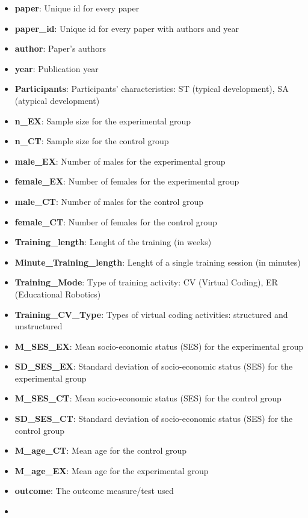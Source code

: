 \documentclass[
]{article}
\providecommand{\tightlist}{%
  \setlength{\itemsep}{0pt}\setlength{\parskip}{0pt}}
\begin{document}
\begin{itemize}
\tightlist
\item
  \textbf{paper}: Unique id for every paper
\item
  \textbf{paper\_id}: Unique id for every paper with authors and year
\item
  \textbf{author}: Paper's authors
\item
  \textbf{year}: Publication year
\item
  \textbf{Participants}: Participants' characteristics: ST (typical development), SA (atypical development)
\item
  \textbf{n\_EX}: Sample size for the experimental group
\item
  \textbf{n\_CT}: Sample size for the control group
\item
  \textbf{male\_EX}: Number of males for the experimental group
\item
  \textbf{female\_EX}: Number of females for the experimental group
\item
  \textbf{male\_CT}: Number of males for the control group
\item
  \textbf{female\_CT}: Number of females for the control group
\item
  \textbf{Training\_length}: Lenght of the training (in weeks)
\item
  \textbf{Minute\_Training\_length}: Lenght of a single training session (in minutes)
\item
  \textbf{Training\_Mode}: Type of training activity: CV (Virtual Coding), ER (Educational Robotics)
\item
  \textbf{Training\_CV\_Type}: Types of virtual coding activities: structured and unstructured
\item
  \textbf{M\_SES\_EX}: Mean socio-economic status (SES) for the experimental group
\item
  \textbf{SD\_SES\_EX}: Standard deviation of socio-economic status (SES) for the experimental group
\item
  \textbf{M\_SES\_CT}: Mean socio-economic status (SES) for the control group
\item
  \textbf{SD\_SES\_CT}: Standard deviation of socio-economic status (SES) for the control group
\item
  \textbf{M\_age\_CT}: Mean age for the control group
\item
  \textbf{M\_age\_EX}: Mean age for the experimental group
\item
  \textbf{outcome}: The outcome measure/test used
\item

\end{itemize}
\end{document}
